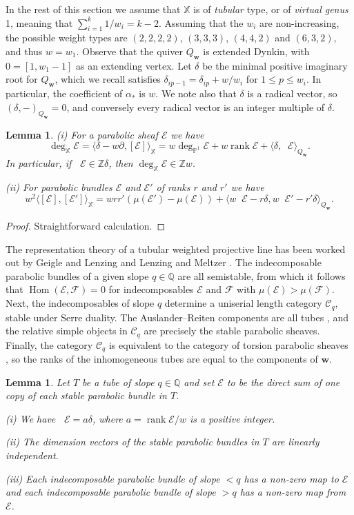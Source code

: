 \documentclass[12pt,a4paper]{amsart}
\theoremstyle{plain}
\newtheorem{lem}[thm]{Lemma}
\newcommand{\Q}{\mathbb Q}
\newcommand{\Z}{\mathbb Z}
\newcommand{\PP}{\mathbb P}
\DeclareMathOperator{\Hom}{Hom}
\DeclareMathOperator{\rank}{rank}
\DeclareMathOperator{\dimv}{\underline\dim}
\newcommand{\F}{\mathcal F}
\newcommand{\E}{\mathcal E}
\newcommand{\CC}{\mathcal C}
\newcommand{\XX}{\mathbb X}
\newcommand{\bw}{\mathbf w}
\begin{document}
In the rest of this section we assume that $\XX$ is of \emph{tubular} type, or of \emph{virtual genus} 1, 
meaning that $\sum_{i=1}^k 1/w_i = k-2$. Assuming that the $w_i$ are non-increasing, the possible weight types are $(2,2,2,2)$, $(3,3,3)$, $(4,4,2)$ and $(6,3,2)$, and thus $w=w_1$. Observe that the quiver $Q_\bw$ is extended Dynkin, with $0=[1,w_1-1]$ as an extending vertex. Let $\delta$ be the minimal positive imaginary root for $Q_\bw$, which we recall satisfies $\delta_{ip-1}=\delta_{ip}+w/w_i$ for $1\leq p\leq w_i$. In particular, the coefficient of $\alpha_*$ is $w$. We note also that $\delta$ is a radical vector, so $(\delta,-)_{Q_\bw}=0$, and conversely every radical vector is an integer multiple of $\delta$.

\begin{lem}
\label{l:degxprop}
(i) For a parabolic sheaf $\E$ we have 
\[ \deg_{\XX} \E = \langle \delta - w\partial , [\E]\rangle_\XX
= w \deg_{\PP^1} \E + w \rank \E + \langle \delta , \dimv \E \rangle_{Q_\bw}. \]
In particular, if $\dimv\E \in \Z \delta$, then $\deg_\XX \E \in \Z w$.

(ii) For parabolic bundles $\E$ and $\E'$ of ranks $r$ and $r'$ we have
\[ w^2\langle [\E],[\E']\rangle_\XX = w r r' (\mu(\E')-\mu(\E)) +
\langle w \dimv \E - r \delta, w \dimv \E' - r' \delta \rangle_{Q_\bw}. \]
\end{lem}

\begin{proof}
Straightforward calculation.
\end{proof}

The representation theory of a tubular weighted projective line has been worked out by Geigle and Lenzing \cite{GL} and Lenzing and Meltzer \cite{LM}. The indecomposable parabolic bundles of a given slope $q\in\Q$ are all semistable, from which it follows that $\Hom(\E,\F)=0$ for indecomposables $\E$ and $\F$ with $\mu(\E)>\mu(\F)$. Next, the indecomposables of slope $q$ determine a uniserial length category $\CC_q$, stable under Serre duality. The Auslander--Reiten components are all tubes \cite[Theorem 5.6]{GL}, and the relative simple objects in $\CC_q$ are precisely the stable parabolic sheaves. Finally, the category $\CC_q$ is equivalent to the category of torsion parabolic sheaves \cite[Theorem 4.4]{LM}, so the ranks of the inhomogeneous tubes are equal to the components of $\bw$.

\begin{lem}
\label{l:slopeqprop}
Let $T$ be a tube of slope $q\in\Q$ and set $\E$ to be the direct sum of one copy of each stable parabolic bundle in $T$.

(i) We have $\dimv \E = a\delta$, where $a=\rank\E/w$ is a positive integer.

(ii) The dimension vectors of the stable parabolic bundles in $T$ are linearly independent.

(iii) Each indecomposable parabolic bundle of slope $<q$ has a non-zero map to $\E$
and each indecomposable parabolic bundle of slope $>q$ has a non-zero map from $\E$.
\end{lem}
\end{document}

